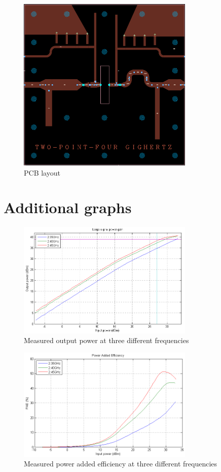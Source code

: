   \begin{figure}[h]
	  \centering
	  \includegraphics[width=0.75\textwidth]{img/Layout_ads}
	  \caption{PCB layout}
	  \label{fig:Layout}
  \end{figure}



\chapter{Additional graphs}

  \begin{figure}[h]
	  \centering
	  \includegraphics[width=0.75\textwidth]{img/Power_Out_1tone}
	  \caption{Measured output power at three different frequencies}
	  \label{fig:Meas_Pout}
  \end{figure}

  \begin{figure}[H]
	  \centering
	  \includegraphics[width=0.75\textwidth]{img/Power_Added_Efficiency}
	  \caption{Measured power added efficiency at three different frequencies}
	  \label{fig:Meas_Pae}
  \end{figure}

